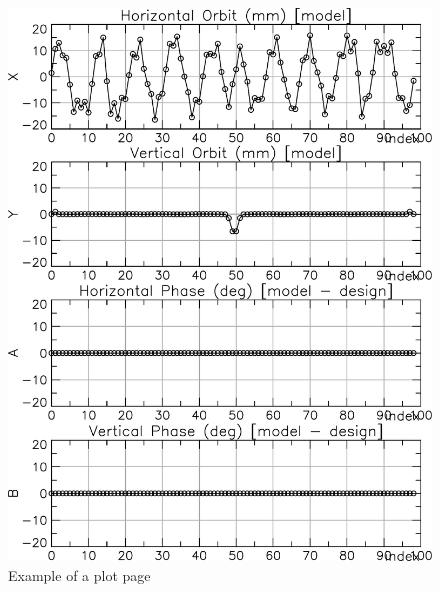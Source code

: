 \begin{figure}
  \centering
  \includegraphics[width=5in]{plot-page1.pdf}
  \caption{Example of a plot page}
  \label{f:plot.page1}
\end{figure}

